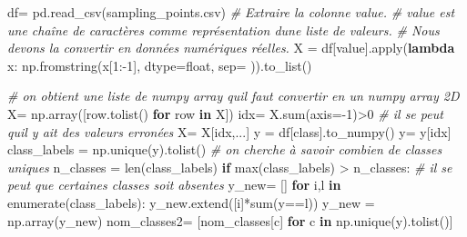 \documentclass[
]{article}
\newenvironment{Shaded}{}{}
\newcommand{\BuiltInTok}[1]{\textcolor[rgb]{0.00,0.50,0.00}{#1}}
\newcommand{\CommentTok}[1]{\textcolor[rgb]{0.38,0.63,0.69}{\textit{#1}}}
\newcommand{\ControlFlowTok}[1]{\textcolor[rgb]{0.00,0.44,0.13}{\textbf{#1}}}
\newcommand{\DecValTok}[1]{\textcolor[rgb]{0.25,0.63,0.44}{#1}}
\newcommand{\KeywordTok}[1]{\textcolor[rgb]{0.00,0.44,0.13}{\textbf{#1}}}
\newcommand{\NormalTok}[1]{#1}
\newcommand{\OperatorTok}[1]{\textcolor[rgb]{0.40,0.40,0.40}{#1}}
\newcommand{\StringTok}[1]{\textcolor[rgb]{0.25,0.44,0.63}{#1}}
\begin{document}
\label{cb7eef63}
\label{cb25}
\begin{Shaded}
\begin{Highlighting}[]
\NormalTok{df}\OperatorTok{=}\NormalTok{ pd.read\_csv(}\StringTok{\textquotesingle{}sampling\_points.csv\textquotesingle{}}\NormalTok{)}
\CommentTok{\# Extraire la colonne \textquotesingle{}value\textquotesingle{}.}
\CommentTok{\# \textquotesingle{}value\textquotesingle{} est une chaîne de caractères comme représentation d\textquotesingle{}une liste de valeurs.}
\CommentTok{\# Nous devons la convertir en données numériques réelles.}
\NormalTok{X }\OperatorTok{=}\NormalTok{ df[}\StringTok{\textquotesingle{}value\textquotesingle{}}\NormalTok{].}\BuiltInTok{apply}\NormalTok{(}\KeywordTok{lambda}\NormalTok{ x: np.fromstring(x[}\DecValTok{1}\NormalTok{:}\OperatorTok{{-}}\DecValTok{1}\NormalTok{], dtype}\OperatorTok{=}\BuiltInTok{float}\NormalTok{, sep}\OperatorTok{=}\StringTok{\textquotesingle{} \textquotesingle{}}\NormalTok{)).to\_list()}

\CommentTok{\# on obtient une liste de numpy array  qu\textquotesingle{}il faut convertir en un numpy array 2D}
\NormalTok{X}\OperatorTok{=}\NormalTok{ np.array([row.tolist() }\ControlFlowTok{for}\NormalTok{ row }\KeywordTok{in}\NormalTok{ X])}
\NormalTok{idx}\OperatorTok{=}\NormalTok{ X.}\BuiltInTok{sum}\NormalTok{(axis}\OperatorTok{={-}}\DecValTok{1}\NormalTok{)}\OperatorTok{\textgreater{}}\DecValTok{0} \CommentTok{\# il se peut qu\textquotesingle{}il y ait des valeurs erronées}
\NormalTok{X}\OperatorTok{=}\NormalTok{ X[idx,...]}
\NormalTok{y }\OperatorTok{=}\NormalTok{ df[}\StringTok{\textquotesingle{}class\textquotesingle{}}\NormalTok{].to\_numpy()}
\NormalTok{y}\OperatorTok{=}\NormalTok{ y[idx]}
\NormalTok{class\_labels }\OperatorTok{=}\NormalTok{ np.unique(y).tolist() }\CommentTok{\# on cherche à savoir combien de classes uniques}
\NormalTok{n\_classes }\OperatorTok{=} \BuiltInTok{len}\NormalTok{(class\_labels)}
\ControlFlowTok{if} \BuiltInTok{max}\NormalTok{(class\_labels) }\OperatorTok{\textgreater{}}\NormalTok{ n\_classes: }\CommentTok{\# il se peut que certaines classes soit absentes}
\NormalTok{  y\_new}\OperatorTok{=}\NormalTok{ []}
  \ControlFlowTok{for}\NormalTok{ i,l }\KeywordTok{in} \BuiltInTok{enumerate}\NormalTok{(class\_labels):}
\NormalTok{    y\_new.extend([i]}\OperatorTok{*}\BuiltInTok{sum}\NormalTok{(y}\OperatorTok{==}\NormalTok{l))}
\NormalTok{  y\_new }\OperatorTok{=}\NormalTok{ np.array(y\_new)}
\NormalTok{nom\_classes2}\OperatorTok{=}\NormalTok{ [nom\_classes[c] }\ControlFlowTok{for}\NormalTok{ c }\KeywordTok{in}\NormalTok{ np.unique(y).tolist()]}
\end{Highlighting}
\end{Shaded}
\end{document}
